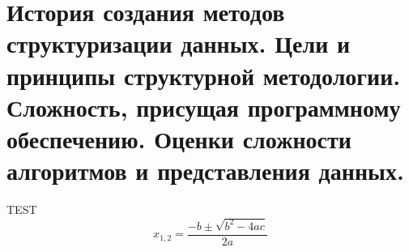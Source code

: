 \section{История создания методов структуризации данных. Цели и принципы структурной методологии. Сложность, присущая программному обеспечению. Оценки сложности алгоритмов и представления данных.}
  TEST
  $$x_{1,2}=\dfrac{-b\pm\sqrt{b^2-4ac}}{2a}$$